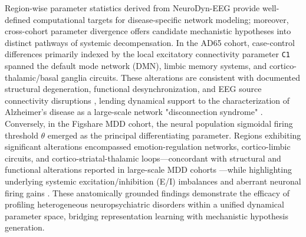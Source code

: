 \documentclass{article}
\begin{document}
{Region-wise parameter statistics derived from NeuroDyn-EEG provide well-defined computational targets for disease-specific network modeling; moreover, cross-cohort parameter divergence offers candidate mechanistic hypotheses into distinct pathways of systemic decompensation. In the AD65 cohort, case-control differences primarily indexed by the local excitatory connectivity parameter \texttt{C1} spanned the default mode network (DMN), limbic memory systems, and cortico-thalamic/basal ganglia circuits. These alterations are consistent with documented structural degeneration, functional desynchronization, and EEG source connectivity disruptions \citep{jeong2004eeg,stam2005eeg,cassani2018systematic,palop2016network,brier2012loss,hata2016functional,buckner2005molecular,seeley2009neurodegenerative}, lending dynamical support to the characterization of Alzheimer's disease as a large-scale network "disconnection syndrome" \citep{delbeuck2003alzheimer,palesi2016exploring}. Conversely, in the Figshare MDD cohort, the neural population sigmoidal firing threshold \texttt{$\theta$} emerged as the principal differentiating parameter. Regions exhibiting significant alterations encompassed emotion-regulation networks, cortico-limbic circuits, and cortico-striatal-thalamic loops—concordant with structural and functional alterations reported in large-scale MDD cohorts \citep{drevets2008brain,price2012neural,kaiser2015large,mulders2015resting,menon2011large,javaheripour2021altered}—while highlighting underlying systemic excitation/inhibition (E/I) imbalances and aberrant neuronal firing gains \citep{hu2023brain,uhlhaas2012neuronal,sanacora2012towards}. These anatomically grounded findings demonstrate the efficacy of profiling heterogeneous neuropsychiatric disorders within a unified dynamical parameter space, bridging representation learning with mechanistic hypothesis generation.

}
\end{document}
